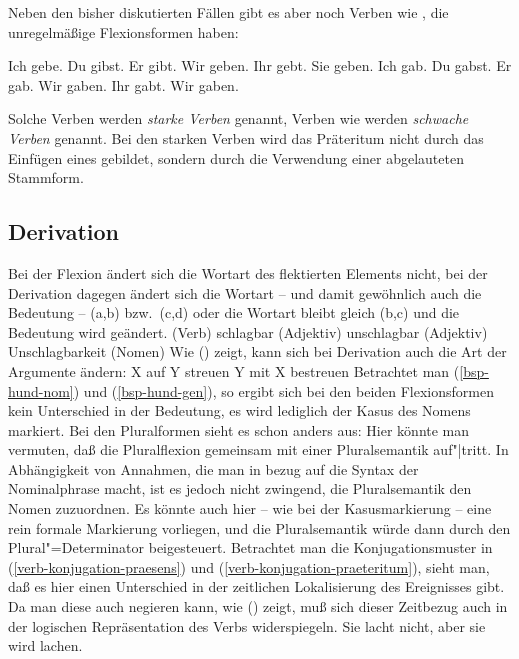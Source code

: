 Neben den bisher diskutierten Fällen gibt es aber noch Verben wie , die unregelmäßige
Flexionsformen haben:
\begin{multicols}{2}
\eal
\ex Ich gebe.   
\ex Du  gibst.  
\ex Er  gibt.   
\ex Wir geben.  
\ex Ihr gebt.   
\ex Sie geben. 
\zl
\eal
\ex Ich gab.
\ex Du  gabst.
\ex Er  gab.
\ex Wir gaben.
\ex Ihr gabt.
\ex Wir gaben. 
\zl
\end{multicols}
\noindent
Solche Verben werden \emph{starke Verben} genannt,
Verben wie  werden \emph{schwache Verben} genannt.
Bei den starken Verben wird das Präteritum nicht durch das Einfügen eines  gebildet,
sondern durch die Verwendung einer abgelauteten Stammform.


\subsection{Derivation}
\label{sec-phen-derivation}

Bei der Flexion ändert sich die Wortart des flektierten Elements nicht, 
bei der Derivation dagegen ändert sich die Wortart -- und damit
gewöhnlich auch die Bedeutung -- (a,b) bzw.\ (c,d) 
oder die Wortart bleibt gleich (b,c) und die Bedeutung wird geändert.
\eal
\ex {} (Verb)
\ex schlagbar (Adjektiv)
\ex unschlagbar (Adjektiv)
\ex Unschlagbarkeit (Nomen)
\zl
Wie () zeigt, kann sich bei Derivation auch die Art der Argumente ändern:
\eal
\ex X auf Y streuen 
\ex Y mit X bestreuen
\zl
Betrachtet man (\ref{bsp-hund-nom}) und (\ref{bsp-hund-gen}), so ergibt sich bei den beiden
Flexionsformen kein Unterschied in der Bedeutung, es wird lediglich der Kasus des Nomens
markiert. Bei den Pluralformen sieht es schon anders aus: Hier könnte man vermuten,
daß die Pluralflexion gemeinsam mit einer Pluralsemantik auf"|tritt. In Abhängigkeit von
Annahmen, die man in bezug auf die Syntax der Nominalphrase macht, ist es jedoch
nicht zwingend, die Pluralsemantik den Nomen zuzuordnen. Es könnte auch hier -- wie bei der Kasusmarkierung --
eine rein formale Markierung vorliegen, und die Pluralsemantik würde dann durch den Plural"=Determinator beigesteuert.
Betrachtet man die Konjugationsmuster in (\ref{verb-konjugation-praesens}) und (\ref{verb-konjugation-praeteritum}),
sieht man, daß es hier einen Unterschied in der zeitlichen Lokalisierung des Ereignisses gibt.
Da man diese auch negieren kann, wie () zeigt, muß sich dieser Zeitbezug auch in der
logischen Repräsentation des Verbs widerspiegeln.
\ea
Sie lacht nicht, aber sie wird lachen.
\z


